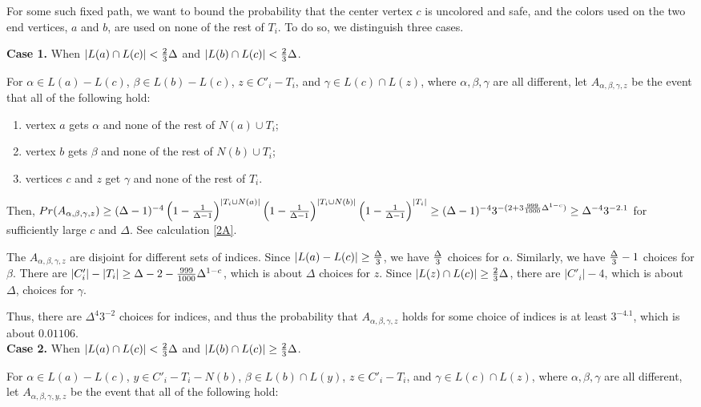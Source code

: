\documentclass[12pt]{article}
\theoremstyle{definition}
\begin{document}
For some such fixed path, we want to bound the probability that the center vertex $c$ is uncolored and safe, and the colors used on the two end vertices, $a$ and $b$, are used on none of the rest of $T_i$. 
To do so, we distinguish three cases. 

{\bf Case 1.} When $|L(a)\cap L(c)|<{2\over 3}\Delta$ and $|L(b)\cap L(c)|<{2\over 3}\Delta$.

For $\alpha\in L(a)-L(c)$, $\beta\in L(b)-L(c)$, $z\in C'_i-T_i$, and $\gamma\in L(c)\cap L(z)$, where $\alpha, \beta, \gamma$ are all different, let $A_{\alpha, \beta, \gamma, z}$ be the event that all of the following hold:

\begin{enumerate}[$(i)$]
\item vertex $a$ gets $\alpha$ and none of the rest of $N(a)\cup T_i$;
\item vertex $b$ gets $\beta$ and none of the rest of $N(b)\cup T_i$;
\item vertices $c$ and $z$ get $\gamma$ and none of the rest of $T_i$.
\end{enumerate} 

Then, $Pr(A_{\alpha, \beta, \gamma, z})\geq (\Delta-1)^{-4}\left(1-{1\over \Delta-1}\right)^{|T_i\cup N(a)|}\left(1-{1\over \Delta-1}\right)^{|T_i\cup N(b)|}\left(1-{1\over \Delta-1}\right)^{|T_i|}\geq (\Delta-1)^{-4}3^{-(2+3{999\over 1 000}\Delta^{1-c})}\geq \Delta^{-4} 3^{-2.1}$ for sufficiently large $c$ and $\Delta$. See calculation \ref{2A}.

The $A_{\alpha, \beta, \gamma, z}$ are disjoint for different sets of indices. 
Since $|L(a)-L(c)|\geq {\Delta\over 3}$, we have $\Delta\over 3$ choices for $\alpha$. 
Similarly, we have ${\Delta\over 3}-1$ choices for $\beta$. 
There are $|C'_i|-|T_i|\geq \Delta-2-{999\over 1000}\Delta^{1-c}$, which is about $\Delta$ choices for $z$. Since $|L(z)\cap L(c)|\geq {2\over 3}\Delta$, there are $|C'_i|-4$, which is about $\Delta$, choices for $\gamma$. 

Thus, there are $\Delta^4 3^{-2}$ choices for indices, and thus the probability that $A_{\alpha, \beta, \gamma, z}$ holds for some choice of indices is at least $3^{-4.1}$, which is about $0.01106$. \\

{\bf Case 2.} When $|L(a)\cap L(c)|<{2\over 3}\Delta$ and $|L(b)\cap L(c)|\geq{2\over 3}\Delta$.

For $\alpha\in L(a)-L(c)$, $y\in C'_i-T_i-N(b)$, $\beta\in L(b)\cap L(y)$, $z\in C'_i-T_i$, and $\gamma\in L(c)\cap L(z)$, where $\alpha, \beta, \gamma$ are all different, let $A_{\alpha, \beta, \gamma, y, z}$ be the event that all of the following hold:
\end{document}
